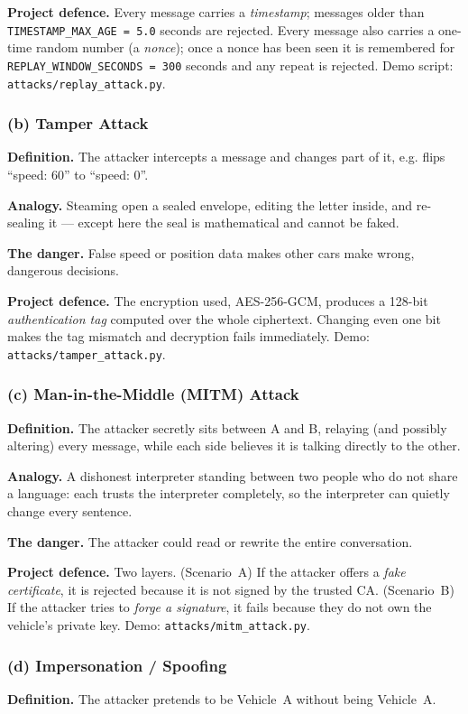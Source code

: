 \documentclass[11pt,a4paper]{article}
\begin{document}
\textbf{Project defence.} Every message carries a \emph{timestamp}; messages
older than \texttt{TIMESTAMP\_MAX\_AGE = 5.0} seconds are rejected. Every message
also carries a one-time random number (a \emph{nonce}); once a nonce has been
seen it is remembered for \texttt{REPLAY\_WINDOW\_SECONDS = 300} seconds and any
repeat is rejected. Demo script: \texttt{attacks/replay\_attack.py}.

\subsubsection*{(b) Tamper Attack}
\textbf{Definition.} The attacker intercepts a message and changes part of it,
e.g. flips ``speed: 60'' to ``speed: 0''.

\textbf{Analogy.} Steaming open a sealed envelope, editing the letter inside,
and re-sealing it --- except here the seal is mathematical and cannot be faked.

\textbf{The danger.} False speed or position data makes other cars make wrong,
dangerous decisions.

\textbf{Project defence.} The encryption used, AES-256-GCM, produces a 128-bit
\emph{authentication tag} computed over the whole ciphertext. Changing even one
bit makes the tag mismatch and decryption fails immediately. Demo:
\texttt{attacks/tamper\_attack.py}.

\subsubsection*{(c) Man-in-the-Middle (MITM) Attack}
\textbf{Definition.} The attacker secretly sits between A and B, relaying (and
possibly altering) every message, while each side believes it is talking
directly to the other.

\textbf{Analogy.} A dishonest interpreter standing between two people who do not
share a language: each trusts the interpreter completely, so the interpreter can
quietly change every sentence.

\textbf{The danger.} The attacker could read or rewrite the entire conversation.

\textbf{Project defence.} Two layers. (Scenario~A) If the attacker offers a
\emph{fake certificate}, it is rejected because it is not signed by the trusted
CA. (Scenario~B) If the attacker tries to \emph{forge a signature}, it fails
because they do not own the vehicle's private key. Demo:
\texttt{attacks/mitm\_attack.py}.

\subsubsection*{(d) Impersonation / Spoofing}
\textbf{Definition.} The attacker pretends to be Vehicle~A without being
Vehicle~A.
\end{document}
